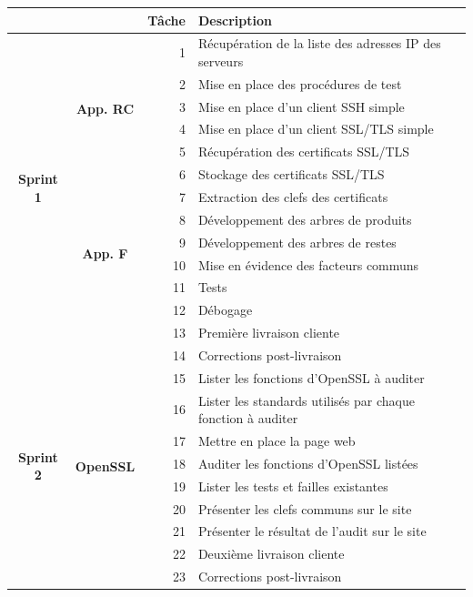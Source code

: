\documentclass[a4paper,11pt,french]{article}
\begin{document}
\begin{tabular}{|c|c|r|l|}
\hline
&&\textbf{Tâche} & \textbf{Description}\\
\hline
\multirow{13}{*}{\begin{sideways}\textbf{Sprint 1}\end{sideways}}&\multirow{6}{*}{\textbf{App. RC}}
&  1 & Récupération de la liste des adresses IP des serveurs\\
&& 2 & Mise en place des procédures de test			\\
&& 3 & Mise en place d'un client SSH simple			\\
&& 4 & Mise en place d'un client SSL/TLS simple		\\
&& 5 & Récupération des certificats SSL/TLS 		\\
&& 6 & Stockage des certificats SSL/TLS				\\
\cline{2-4}
&\multirow{6}{*}{\textbf{App. F}}
&  7 &  Extraction des clefs des certificats		\\
&& 8 &  Développement des arbres de produits		\\
&& 9 &  Développement des arbres de restes			\\
&& 10 &  Mise en évidence des facteurs communs		\\
&& 11 &  Tests										\\
&& 12 &  Débogage									\\
&& 13 &  Première livraison cliente					\\
&& 14 &  Corrections post-livraison								\\
\cline{1-4}
\multirow{8}{*}{\begin{sideways}\textbf{Sprint 2}\end{sideways}}&\multirow{8}{*}{\textbf{OpenSSL}}
&  15 &  Lister les fonctions d'OpenSSL à auditer\\
&& 16 &  Lister les standards utilisés par chaque fonction à auditer\\
&& 17 &  Mettre en place la page web\\
&& 18 &	 Auditer les fonctions d'OpenSSL listées\\
&& 19 &  Lister les tests et failles existantes\\
&& 20 &  Présenter les clefs communs sur le site\\
&& 21 &  Présenter le résultat de l'audit sur le site\\
&& 22 &  Deuxième livraison cliente\\
&& 23 &  Corrections post-livraison\\
\hline


\end{tabular}
\end{document}
